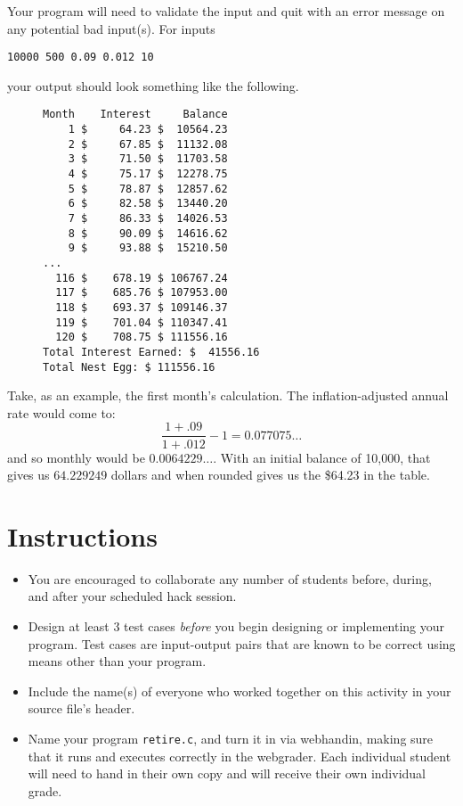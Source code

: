 \documentclass[12pt]{scrartcl}
\begin{document}
Your program will need to validate the input and quit with an error
message on any potential bad input(s).  For inputs 

\texttt{10000 500 0.09 0.012 10} 

your output should look something like the following.

\begin{figure}[H]
\begin{verbatim}
Month    Interest     Balance 
    1 $     64.23 $  10564.23
    2 $     67.85 $  11132.08
    3 $     71.50 $  11703.58
    4 $     75.17 $  12278.75
    5 $     78.87 $  12857.62
    6 $     82.58 $  13440.20
    7 $     86.33 $  14026.53
    8 $     90.09 $  14616.62
    9 $     93.88 $  15210.50
...    
  116 $    678.19 $ 106767.24
  117 $    685.76 $ 107953.00
  118 $    693.37 $ 109146.37
  119 $    701.04 $ 110347.41
  120 $    708.75 $ 111556.16
Total Interest Earned: $  41556.16
Total Nest Egg: $ 111556.16
\end{verbatim}
\end{figure}

Take, as an example, the first month's calculation.  The 
inflation-adjusted annual rate would come to:
  $$\frac{1 + .09}{1+.012} - 1 = 0.077075\ldots$$
and so monthly would be $0.0064229\ldots$.  With an initial
balance of 10,000, that gives us $64.229249$ dollars and when
rounded gives us the \$64.23 in the table.


\section*{Instructions}

\begin{itemize}
  \item You are encouraged to collaborate any number of students 
  before, during, and after your scheduled hack session.  
  \item Design at least 3 test cases \emph{before} you begin
  designing or implementing your program.  Test cases are 
  input-output pairs that are known to be correct using means
  other than your program.
  \item Include the name(s) of everyone who worked together on
  this activity in your source file's header.
  \item Name your program \texttt{retire.c}, and
  turn it in via webhandin, making sure that it runs and executes
  correctly in the webgrader.  Each individual student will need
  to hand in their own copy and will receive their own individual
  grade.
\end{itemize}
  
\end{document}
